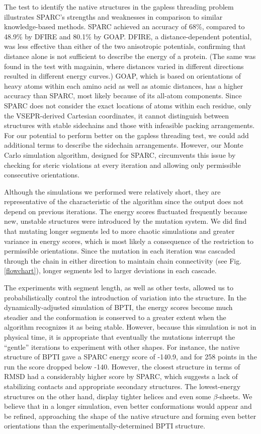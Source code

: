 \documentclass[11pt,titlepage]{article}
\begin{document}
The test to identify the native structures in the gapless threading problem illustrates SPARC's strengths and weaknesses in comparison to similar knowledge-based methods.
SPARC achieved an accuracy of 68\%, compared to 48.9\% by DFIRE and 80.1\% by GOAP.
DFIRE, a distance-dependent potential, was less effective than either of the two anisotropic potentials, confirming that distance alone is not sufficient to describe the energy of a protein.
(The same was found in the test with magainin, where distances varied in different directions resulted in different energy curves.)
GOAP, which is based on orientations of heavy atoms within each amino acid as well as atomic distances, has a higher accuracy than SPARC, most likely because of its all-atom components.
Since SPARC does not consider the exact locations of atoms within each residue, only the VSEPR-derived Cartesian coordinates, it cannot distinguish between structures with stable sidechains and those with infeasible packing arrangements.
For our potential to perform better on the gapless threading test, we could add additional terms to describe the sidechain arrangements.
However, our Monte Carlo simulation algorithm, designed for SPARC, circumvents this issue by checking for steric violations at every iteration and allowing only permissible consecutive orientations.

Although the simulations we performed were relatively short, they are representative of the characteristic of the algorithm since the output does not depend on previous iterations.
The energy scores fluctuated frequently because new, unstable structures were introduced by the mutation system.
We did find that mutating longer segments led to more chaotic simulations and greater variance in energy scores, which is most likely a consequence of the restriction to permissible orientations.
Since the mutation in each iteration was cascaded through the chain in either direction to maintain chain connectivity (see Fig. \ref{flowchart}), longer segments led to larger deviations in each cascade.

The experiments with segment length, as well as other tests, allowed us to probabilistically control the introduction of variation into the structure.
In the dynamically-adjusted simulation of BPTI, the energy scores become much steadier and the conformation is conserved to a greater extent when the algorithm recognizes it as being stable.
However, because this simulation is not in physical time, it is appropriate that eventually the mutations interrupt the ``gentle'' iterations to experiment with other shapes.
For instance, the native structure of BPTI gave a SPARC energy score of -140.9, and for 258 points in the run the score dropped below -140.
However, the closest structure in terms of RMSD had a considerably higher score by SPARC, which suggests a lack of stabilizing contacts and appropriate secondary structures.
The lowest-energy structures on the other hand, display tighter helices and even some $\beta$-sheets.
We believe that in a longer simulation, even better conformations would appear and be refined, approaching the shape of the native structure and forming even better orientations than the experimentally-determined BPTI structure.
\end{document}
